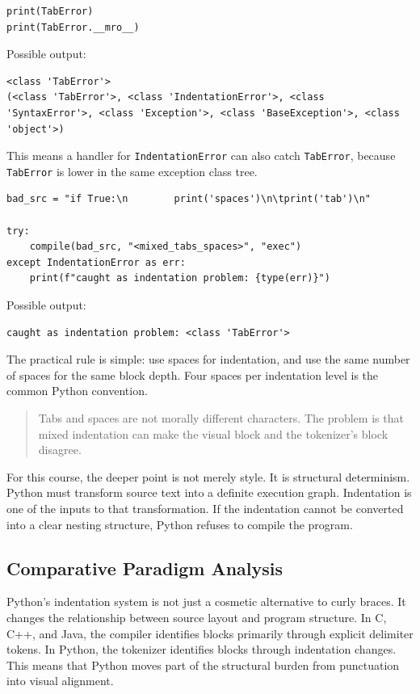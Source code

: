 \documentclass[a4paper,twoside]{report}
\begin{document}
\begin{verbatim}
print(TabError)
print(TabError.__mro__)
\end{verbatim}

Possible output:

\begin{verbatim}
<class 'TabError'>
(<class 'TabError'>, <class 'IndentationError'>, <class 'SyntaxError'>, <class 'Exception'>, <class 'BaseException'>, <class 'object'>)
\end{verbatim}

This means a handler for \texttt{IndentationError} can also catch \texttt{TabError}, because \texttt{TabError} is lower in the same exception class tree.

\begin{verbatim}
bad_src = "if True:\n        print('spaces')\n\tprint('tab')\n"

try:
    compile(bad_src, "<mixed_tabs_spaces>", "exec")
except IndentationError as err:
    print(f"caught as indentation problem: {type(err)}")
\end{verbatim}

Possible output:

\begin{verbatim}
caught as indentation problem: <class 'TabError'>
\end{verbatim}

The practical rule is simple: use spaces for indentation, and use the same number of spaces for the same block depth. Four spaces per indentation level is the common Python convention.

\begin{quote}
Tabs and spaces are not morally different characters. The problem is that mixed indentation can make the visual block and the tokenizer's block disagree.
\end{quote}

For this course, the deeper point is not merely style. It is structural determinism. Python must transform source text into a definite execution graph. Indentation is one of the inputs to that transformation. If the indentation cannot be converted into a clear nesting structure, Python refuses to compile the program.

\subsection{Comparative Paradigm Analysis}

Python's indentation system is not just a cosmetic alternative to curly braces. It changes the relationship between source layout and program structure. In C, C++, and Java, the compiler identifies blocks primarily through explicit delimiter tokens. In Python, the tokenizer identifies blocks through indentation changes. This means that Python moves part of the structural burden from punctuation into visual alignment.
\end{document}
